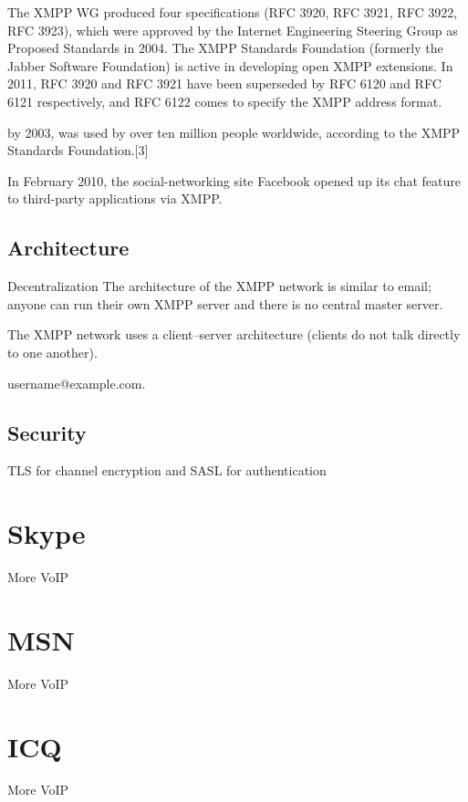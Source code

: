 The XMPP WG produced four specifications (RFC 3920, RFC 3921, RFC 3922, RFC 3923), which were approved by the Internet Engineering Steering Group as Proposed Standards in 2004. The XMPP Standards Foundation (formerly the Jabber Software Foundation) is active in developing open XMPP extensions. In 2011, RFC 3920 and RFC 3921 have been superseded by RFC 6120 and RFC 6121 respectively, and RFC 6122 comes to specify the XMPP address format.

by 2003, was used by over ten million people worldwide, according to the XMPP Standards Foundation.[3]

In February 2010, the social-networking site Facebook opened up its chat feature to third-party applications via XMPP.

\subsection{Architecture}

Decentralization
The architecture of the XMPP network is similar to email; anyone can run their own XMPP server and there is no central master server.

The XMPP network uses a client–server architecture (clients do not talk directly to one another). 

username@example.com.
\subsection{Security}
TLS for channel encryption and SASL for authentication

\section{Skype}
More VoIP
\section{MSN}
More VoIP
\section{ICQ}
More VoIP


